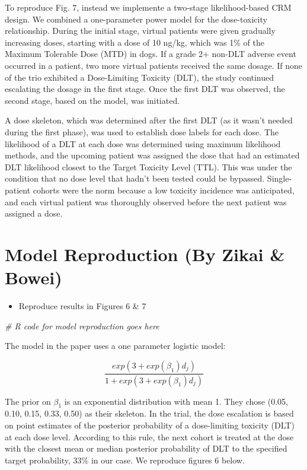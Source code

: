 \documentclass[
]{article}
\newenvironment{Shaded}{\begin{snugshade}}{\end{snugshade}}
\newcommand{\CommentTok}[1]{\textcolor[rgb]{0.56,0.35,0.01}{\textit{#1}}}
\providecommand{\tightlist}{%
  \setlength{\itemsep}{0pt}\setlength{\parskip}{0pt}}
\begin{document}
To reproduce Fig. 7, instead we implemente a two-stage likelihood-based
CRM design. We combined a one-parameter power model for the
dose-toxicity relationship. During the initial stage, virtual patients
were given gradually increasing doses, starting with a dose of 10 ng/kg,
which was 1\% of the Maximum Tolerable Dose (MTD) in dogs. If a grade 2+
non-DLT adverse event occurred in a patient, two more virtual patients
received the same dosage. If none of the trio exhibited a Dose-Limiting
Toxicity (DLT), the study continued escalating the dosage in the first
stage. Once the first DLT was observed, the second stage, based on the
model, was initiated.

A dose skeleton, which was determined after the first DLT (as it wasn't
needed during the first phase), was used to establish dose labels for
each dose. The likelihood of a DLT at each dose was determined using
maximum likelihood methods, and the upcoming patient was assigned the
dose that had an estimated DLT likelihood closest to the Target Toxicity
Level (TTL). This was under the condition that no dose level that hadn't
been tested could be bypassed. Single-patient cohorts were the norm
because a low toxicity incidence was anticipated, and each virtual
patient was thoroughly observed before the next patient was assigned a
dose.

\hypertarget{model-reproduction-by-zikai-bowei}{%
\section{Model Reproduction (By Zikai \&
Bowei)}\label{model-reproduction-by-zikai-bowei}}

\begin{itemize}
\tightlist
\item
  Reproduce results in Figures 6 \& 7
\end{itemize}

\begin{Shaded}
\begin{Highlighting}[]
\CommentTok{\# R code for model reproduction goes here}
\end{Highlighting}
\end{Shaded}

The model in the paper uses a one parameter logistic model:

\[
\frac{exp(3+exp(\beta_1)d_j)}{1+exp(3+exp(\beta_1)d_j)}
\]

The prior on \(\beta_1\) is an exponential distribution with mean 1.
They chose (0.05, 0.10, 0.15, 0.33, 0.50) as their skeleton. In the
trial, the dose escalation is based on point estimates of the posterior
probability of a dose-limiting toxicity (DLT) at each dose level.
According to this rule, the next cohort is treated at the dose with the
closest mean or median posterior probability of DLT to the specified
target probability, 33\% in our case. We reproduce figures 6 below.
\end{document}
